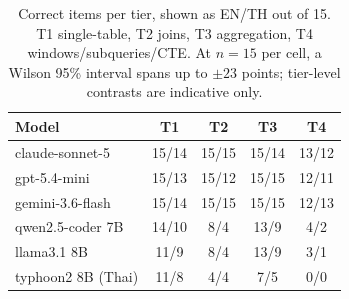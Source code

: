 \begin{table}[t]
\caption{Correct items per tier, shown as EN/TH out of 15. T1
single-table, T2 joins, T3 aggregation, T4 windows/subqueries/CTE.
At $n{=}15$ per cell, a Wilson 95\% interval spans up to
$\pm23$ points;
tier-level contrasts are indicative only.}
\label{tab:tiers}
\centering\small
\begin{tabular}{lcccc}
\toprule
Model & T1 & T2 & T3 & T4 \\
\midrule
claude-sonnet-5 & 15/14 & 15/15 & 15/14 & 13/12 \\
gpt-5.4-mini & 15/13 & 15/12 & 15/15 & 12/11 \\
gemini-3.6-flash & 15/14 & 15/15 & 15/15 & 12/13 \\
qwen2.5-coder 7B & 14/10 & 8/4 & 13/9 & 4/2 \\
llama3.1 8B & 11/9 & 8/4 & 13/9 & 3/1 \\
typhoon2 8B (Thai) & 11/8 & 4/4 & 7/5 & 0/0 \\
\bottomrule
\end{tabular}
\end{table}

